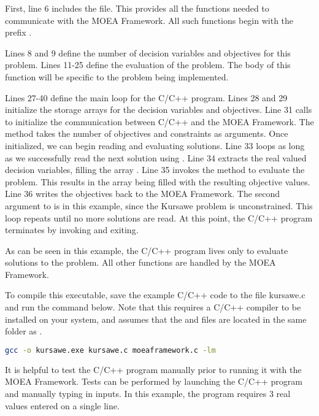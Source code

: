 First, line 6 includes the  file.  This provides all the functions needed to communicate with the MOEA Framework.  All such functions begin with the prefix .

Lines 8 and 9 define the number of decision variables and objectives for this problem.  Lines 11-25 define the evaluation of the problem.  The body of this function will be specific to the problem being implemented.

Lines 27-40 define the main loop for the C/C++ program.  Lines 28 and 29 initialize the storage arrays for the decision variables and objectives.  Line 31 calls  to initialize the communication between C/C++ and the MOEA Framework.  The  method takes the number of objectives and constraints as arguments.  Once initialized, we can begin reading and evaluating solutions.  Line 33 loops as long as we successfully read the next solution using .  Line 34 extracts the real valued decision variables, filling the array .  Line 35 invokes the  method to evaluate the problem.  This results in the array  being filled with the resulting objective values.  Line 36 writes the objectives back to the MOEA Framework.  The second argument to  is  in this example, since the Kursawe problem is unconstrained.  This loop repeats until no more solutions are read.  At this point, the C/C++ program terminates by invoking  and exiting.

As can be seen in this example, the C/C++ program lives only to evaluate solutions to the problem.  All other functions are handled by the MOEA Framework.

To compile this executable, save the example C/C++ code to the file kursawe.c and run the command below.  Note that this requires a C/C++ compiler to be installed on your system, and assumes that the  and  files are located in the same folder as .

\begin{lstlisting}[language=bash]
gcc -o kursawe.exe kursawe.c moeaframework.c -lm
\end{lstlisting}

It is helpful to test the C/C++ program manually prior to running it with the MOEA Framework.  Tests can be performed by launching the C/C++ program and manually typing in inputs.  In this example, the program requires 3 real values entered on a single line.

